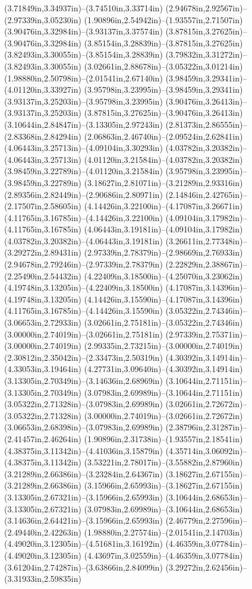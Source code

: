 (3.71849in,3.34937in)--(3.74510in,3.33714in) (2.94678in,2.92567in)--(2.97339in,3.05230in) (1.90896in,2.54942in)--(1.93557in,2.71507in) (3.90476in,3.32984in)--(3.93137in,3.37574in) (3.87815in,3.27625in)--(3.90476in,3.32984in) (3.85154in,3.28839in)--(3.87815in,3.27625in) (3.82493in,3.30055in)--(3.85154in,3.28839in) (3.79832in,3.31272in)--(3.82493in,3.30055in) (3.02661in,2.88678in)--(3.05322in,3.01214in) (1.98880in,2.50798in)--(2.01541in,2.67140in) (3.98459in,3.29341in)--(4.01120in,3.33927in) (3.95798in,3.23995in)--(3.98459in,3.29341in) (3.93137in,3.25203in)--(3.95798in,3.23995in) (3.90476in,3.26413in)--(3.93137in,3.25203in) (3.87815in,3.27625in)--(3.90476in,3.26413in) (3.10644in,2.84847in)--(3.13305in,2.97243in) (2.81373in,2.86555in)--(2.83368in,2.84294in) (2.06863in,2.46740in)--(2.09524in,2.62841in) (4.06443in,3.25713in)--(4.09104in,3.30293in) (4.03782in,3.20382in)--(4.06443in,3.25713in) (4.01120in,3.21584in)--(4.03782in,3.20382in) (3.98459in,3.22789in)--(4.01120in,3.21584in) (3.95798in,3.23995in)--(3.98459in,3.22789in) (3.18627in,2.81071in)--(3.21289in,2.93316in) (2.89356in,2.82449in)--(2.90686in,2.80971in) (2.14846in,2.42765in)--(2.17507in,2.58605in) (4.14426in,3.22100in)--(4.17087in,3.26671in) (4.11765in,3.16785in)--(4.14426in,3.22100in) (4.09104in,3.17982in)--(4.11765in,3.16785in) (4.06443in,3.19181in)--(4.09104in,3.17982in) (4.03782in,3.20382in)--(4.06443in,3.19181in) (3.26611in,2.77348in)--(3.29272in,2.89431in) (2.97339in,2.78379in)--(2.98669in,2.76933in) (2.94678in,2.79246in)--(2.97339in,2.78379in) (2.22829in,2.38867in)--(2.25490in,2.54432in) (4.22409in,3.18500in)--(4.25070in,3.23062in) (4.19748in,3.13205in)--(4.22409in,3.18500in) (4.17087in,3.14396in)--(4.19748in,3.13205in) (4.14426in,3.15590in)--(4.17087in,3.14396in) (4.11765in,3.16785in)--(4.14426in,3.15590in) (3.05322in,2.74346in)--(3.06653in,2.72933in) (3.02661in,2.75181in)--(3.05322in,2.74346in) (3.00000in,2.74019in)--(3.02661in,2.75181in) (2.97339in,2.75371in)--(3.00000in,2.74019in) (2.99335in,2.73215in)--(3.00000in,2.74019in) (2.30812in,2.35042in)--(2.33473in,2.50319in) (4.30392in,3.14914in)--(4.33053in,3.19464in) (4.27731in,3.09640in)--(4.30392in,3.14914in) (3.13305in,2.70349in)--(3.14636in,2.68969in) (3.10644in,2.71151in)--(3.13305in,2.70349in) (3.07983in,2.69989in)--(3.10644in,2.71151in) (3.05322in,2.71328in)--(3.07983in,2.69989in) (3.02661in,2.72672in)--(3.05322in,2.71328in) (3.00000in,2.74019in)--(3.02661in,2.72672in) (3.06653in,2.68398in)--(3.07983in,2.69989in) (2.38796in,2.31287in)--(2.41457in,2.46264in) (1.90896in,2.31738in)--(1.93557in,2.18541in) (4.38375in,3.11342in)--(4.41036in,3.15879in) (4.35714in,3.06092in)--(4.38375in,3.11342in) (3.53221in,2.78017in)--(3.55882in,2.87960in) (3.21289in,2.66386in)--(3.23284in,2.64367in) (3.18627in,2.67155in)--(3.21289in,2.66386in) (3.15966in,2.65993in)--(3.18627in,2.67155in) (3.13305in,2.67321in)--(3.15966in,2.65993in) (3.10644in,2.68653in)--(3.13305in,2.67321in) (3.07983in,2.69989in)--(3.10644in,2.68653in) (3.14636in,2.64421in)--(3.15966in,2.65993in) (2.46779in,2.27596in)--(2.49440in,2.42263in) (1.98880in,2.27574in)--(2.01541in,2.14703in) (4.49020in,3.12305in)--(4.51681in,3.16192in) (4.46359in,3.07784in)--(4.49020in,3.12305in) (4.43697in,3.02559in)--(4.46359in,3.07784in) (3.61204in,2.74287in)--(3.63866in,2.84099in) (3.29272in,2.62456in)--(3.31933in,2.59835in) 